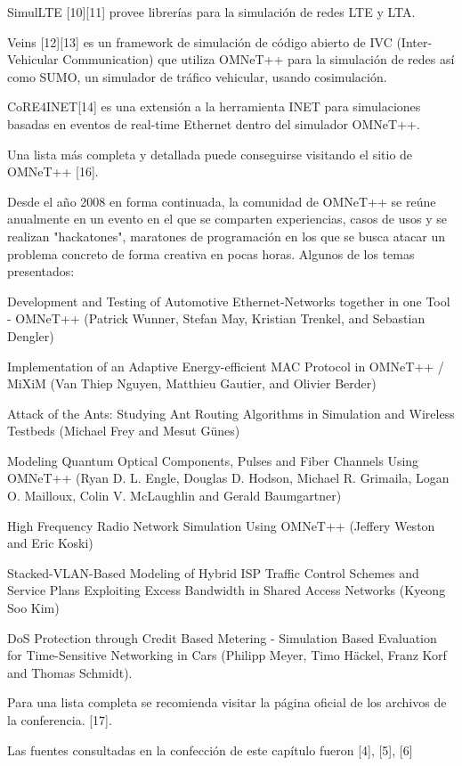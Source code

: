 \documentclass[]{article}
\begin{document}
SimulLTE [10][11] provee librerías para la simulación de redes LTE y LTA.

Veins [12][13] es un framework de simulación de código abierto de IVC
(Inter-Vehicular Communication) que utiliza OMNeT++ para la simulación de redes
así como SUMO, un simulador de tráfico vehicular, usando cosimulación.

CoRE4INET[14] es una extensión a la herramienta INET para simulaciones basadas
en eventos de real-time Ethernet dentro del simulador OMNeT++.

Una lista más completa y detallada puede conseguirse visitando el sitio de
OMNeT++ [16].

Desde el año 2008 en forma continuada, la comunidad de OMNeT++ se reúne
anualmente en un evento en el que se comparten experiencias, casos de usos y se
realizan "hackatones", maratones de programación en los que se busca atacar un
problema concreto de forma creativa en pocas horas. Algunos de los temas
presentados:


Development and Testing of Automotive Ethernet-Networks together in one Tool -
OMNeT++ (Patrick Wunner, Stefan May, Kristian Trenkel, and Sebastian Dengler)

Implementation of an Adaptive Energy-efficient MAC Protocol in OMNeT++ / MiXiM
(Van Thiep Nguyen, Matthieu Gautier, and Olivier Berder)

Attack of the Ants: Studying Ant Routing Algorithms in Simulation and Wireless
Testbeds (Michael Frey and Mesut Günes)

Modeling Quantum Optical Components, Pulses and Fiber Channels Using OMNeT++
(Ryan D. L. Engle, Douglas D. Hodson, Michael R. Grimaila, Logan O. Mailloux,
Colin V. McLaughlin and Gerald Baumgartner)

High Frequency Radio Network Simulation Using OMNeT++ (Jeffery Weston and Eric
Koski)

Stacked-VLAN-Based Modeling of Hybrid ISP Traffic Control Schemes and Service
Plans Exploiting Excess Bandwidth in Shared Access Networks (Kyeong Soo Kim)

DoS Protection through Credit Based Metering - Simulation Based Evaluation for
Time-Sensitive Networking in Cars (Philipp Meyer, Timo Häckel, Franz Korf and
Thomas Schmidt).

Para una lista completa se recomienda visitar la página oficial de los archivos
de la conferencia. [17].

Las fuentes consultadas en la confección de este capítulo fueron [4], [5], [6]
\end{document}
